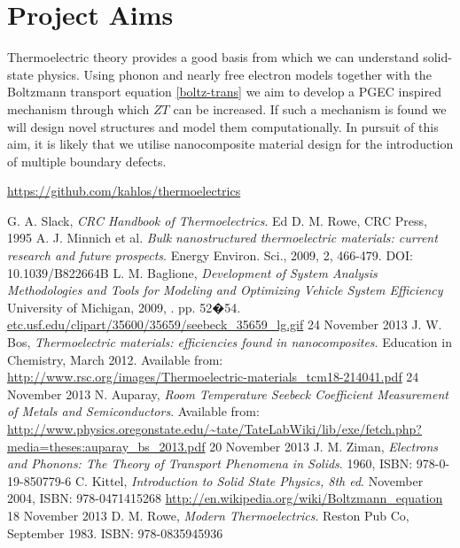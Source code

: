 \documentclass[12pt,titlepage,draft]{article}
\begin{document}
\section{Project Aims}
Thermoelectric theory provides a good basis from which we can
understand solid-state physics. Using phonon and nearly free electron models together with
the Boltzmann transport equation \eqref{boltz-trans} we aim to develop
a \ac{PGEC} inspired mechanism through which $ZT$ can be increased. If such a mechanism is found we will design novel structures and model them computationally. In pursuit of this aim, it is
likely that we utilise nanocomposite material design for the
introduction of multiple boundary defects.

\url{https://github.com/kahlos/thermoelectrics}


\begin{thebibliography}{5}
G. A. Slack, \emph{CRC Handbook of Thermoelectrics}. Ed D. M. Rowe, CRC Press, 1995
A. J. Minnich et al. \emph{Bulk nanostructured thermoelectric
materials: current research and future prospects}. Energy Environ.
Sci., 2009, 2, 466-479. DOI: 10.1039/B822664B
L. M. Baglione, \emph{Development of System Analysis Methodologies and Tools for Modeling and Optimizing Vehicle System Efficiency} University of Michigan, 2009, . pp. 52�54.
\url{etc.usf.edu/clipart/35600/35659/seebeck_35659_lg.gif} 24 November
2013
J. W. Bos, \emph{Thermoelectric materials: efficiencies found in
nanocomposites}. Education in Chemistry, March 2012. Available
from:
\url{http://www.rsc.org/images/Thermoelectric-materials_tcm18-214041.pdf} 24 November 2013
N. Auparay, \emph{Room Temperature Seebeck Coefficient Measurement
of Metals and Semiconductors}. Available
from:
\url{http://www.physics.oregonstate.edu/~tate/TateLabWiki/lib/exe/fetch.php?media=theses:auparay_bs_2013.pdf} 20 November 2013
J. M. Ziman, \emph{Electrons and Phonons: The Theory of Transport
Phenomena in Solids}. 1960, ISBN: 978-0-19-850779-6
C. Kittel, \emph{Introduction to Solid State Physics, 8th ed}. November 2004, ISBN: 978-0471415268
\url{http://en.wikipedia.org/wiki/Boltzmann_equation} 18 November 2013
D. M. Rowe, \emph{Modern Thermoelectrics}. Reston Pub Co, September
1983. ISBN: 978-0835945936
\end{thebibliography}
\end{document}
